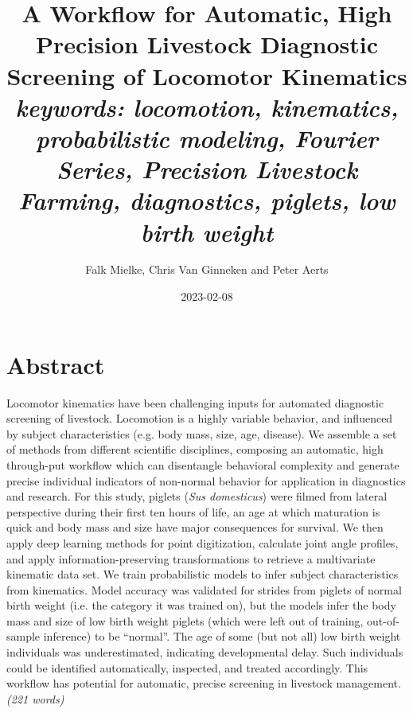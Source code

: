 \documentclass[10pt,a4paper]{article}
\author{Falk Mielke, Chris Van Ginneken and Peter Aerts}
\date{2023-02-08}
\title{A Workflow for Automatic, High Precision Livestock Diagnostic Screening of Locomotor Kinematics\\\medskip
\large \emph{keywords: locomotion, kinematics, probabilistic modeling, Fourier Series, Precision Livestock Farming, diagnostics, piglets, low birth weight}}
\begin{document}
\maketitle
\setcounter{tocdepth}{1}
\tableofcontents

\clearpage

\section{Abstract}
\label{abstract}
Locomotor kinematics have been challenging inputs for automated diagnostic screening of livestock.
Locomotion is a highly variable behavior, and influenced by subject characteristics (e.g. body mass, size, age, disease).
We assemble a set of methods from different scientific disciplines, composing an automatic, high through-put workflow which can disentangle behavioral complexity and generate precise individual indicators of non-normal behavior for application in diagnostics and research.
For this study, piglets (\emph{Sus domesticus}) were filmed from lateral perspective during their first ten hours of life, an age at which maturation is quick and body mass and size have major consequences for survival.
We then apply deep learning methods for point digitization, calculate joint angle profiles, and apply information-preserving transformations to retrieve a multivariate kinematic data set.
We train probabilistic models to infer subject characteristics from kinematics.
Model accuracy was validated for strides from piglets of normal birth weight (i.e. the category it was trained on), but the models infer the body mass and size of low birth weight piglets (which were left out of training, out-of-sample inference) to be ``normal''.
The age of some (but not all) low birth weight individuals was underestimated, indicating developmental delay.
Such individuals could be identified automatically, inspected, and treated accordingly.
This workflow has potential for automatic, precise screening in livestock management.
\emph{(221 words)}


\FloatBarrier
\clearpage
\end{document}
